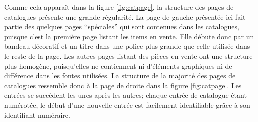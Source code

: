 Comme cela apparaît dans la figure \ref{fig:catpage}, la structure des pages de catalogues présente une grande régularité. La page de gauche présentée ici fait partie des quelques pages \enquote{spéciales} qui sont contenues dans les catalogues, puisque c'est la première page listant les items en vente. Elle débute donc par un bandeau décoratif et un titre dans une police plus grande que celle utilisée dans le reste de la page. Les autres pages listant des pièces en vente ont une structure plus homogène, puisqu'elles ne contiennent ni d'éléments graphiques ni de différence dans les fontes utilisées. La structure de la majorité des pages de catalogues ressemble donc à la page de droite dans la figure \ref{fig:catpage}. Les entrées se succèdent les unes après les autres; chaque entrée de catalogue étant numérotée, le début d'une nouvelle entrée est facilement identifiable grâce à son identifiant numéraire.

